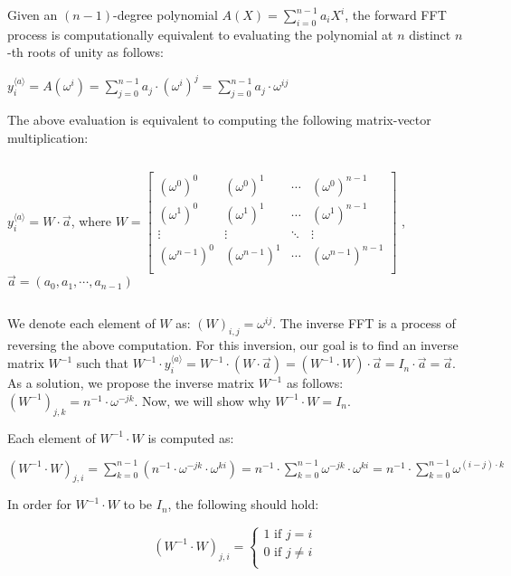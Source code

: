 Given an $(n-1)$-degree polynomial 
$A(X) = \sum\limits_{i=0}^{n-1}a_iX^i$, the forward FFT process is computationally equivalent to evaluating the polynomial at $n$ distinct $n$-th roots of unity as follows:

${y}_i^{\langle a \rangle} = A(\omega^i) = \sum\limits_{j=0}^{n-1}a_{j}\cdot (\omega^i)^j = \sum\limits_{j=0}^{n-1}a_{j}\cdot \omega^{ij}$

The above evaluation is equivalent to computing the following matrix-vector multiplication: 

$ $

${y}_i^{\langle a \rangle} = W \cdot \vec{a}$, \text{ } where $W = \begin{bmatrix}
(\omega^0)^0 & (\omega^0)^1 & \cdots & (\omega^0)^{n-1}\\
(\omega^1)^0 & (\omega^1)^1 & \cdots & (\omega^1)^{n-1}\\
\vdots & \vdots & \ddots & \vdots \\
(\omega^{n-1})^0 & (\omega^{n-1})^1 & \cdots & (\omega^{n-1})^{n-1}\\
\end{bmatrix} $
, \text{ } $\vec{a} = (a_0, a_1, \cdots, a_{n-1})$


$ $

We denote each element of $W$ as: $(W)_{i,j} = \omega^{ij}$. The inverse FFT is a process of reversing the above computation. For this inversion, our goal is to find an inverse matrix $W^{-1}$ such that $W^{-1} \cdot {y}_i^{\langle a \rangle} = W^{-1} \cdot (W \cdot \vec{a}) = (W^{-1} \cdot W) \cdot \vec{a} = I_n \cdot \vec{a} =  \vec{a}$. As a solution, we propose the inverse matrix $W^{-1}$ as follows: $(W^{-1})_{j,k} = n^{-1}\cdot \omega^{-jk}$. Now, we will show why $W^{-1} \cdot W = I_n$. 

Each element of $W^{-1} \cdot W$ is computed as: 

$(W^{-1} \cdot W)_{j, i} = \sum\limits_{k=0}^{n-1}(n^{-1}\cdot \omega^{-jk} \cdot \omega^{ki}) = n^{-1}\cdot\sum\limits_{k=0}^{n-1}\omega^{-jk} \cdot \omega^{ki} = n^{-1}\cdot\sum\limits_{k=0}^{n-1}\omega^{(i-j)\cdot k}$

In order for $W^{-1} \cdot W$ to be $I_n$, the following should hold:

\[
(W^{-1} \cdot W)_{j, i} = \begin{cases}
\text{1 if } j = i \\
\text{0 if } j \neq i \\
\end{cases}
\]

